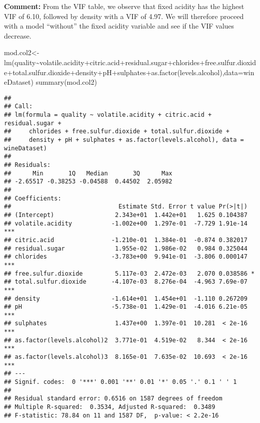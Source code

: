\documentclass[
]{article}
\newenvironment{Shaded}{\begin{snugshade}}{\end{snugshade}}
\newcommand{\AttributeTok}[1]{\textcolor[rgb]{0.77,0.63,0.00}{#1}}
\newcommand{\FunctionTok}[1]{\textcolor[rgb]{0.00,0.00,0.00}{#1}}
\newcommand{\NormalTok}[1]{#1}
\newcommand{\OtherTok}[1]{\textcolor[rgb]{0.56,0.35,0.01}{#1}}
\newcommand{\SpecialCharTok}[1]{\textcolor[rgb]{0.00,0.00,0.00}{#1}}
\begin{document}
\textbf{Comment:} From the VIF table, we observe that fixed acidity has
the highest VIF of 6.10, followed by density with a VIF of 4.97. We will
therefore proceed with a model ``without'' the fixed acidity variable
and see if the VIF values decrease.

\begin{Shaded}
\begin{Highlighting}[]
\NormalTok{mod.col2}\OtherTok{\textless{}{-}}\FunctionTok{lm}\NormalTok{(quality}\SpecialCharTok{\textasciitilde{}}\NormalTok{volatile.acidity}\SpecialCharTok{+}\NormalTok{citric.acid}\SpecialCharTok{+}\NormalTok{residual.sugar}\SpecialCharTok{+}\NormalTok{chlorides}\SpecialCharTok{+}\NormalTok{free.sulfur.dioxide}\SpecialCharTok{+}\NormalTok{total.sulfur.dioxide}\SpecialCharTok{+}\NormalTok{density}\SpecialCharTok{+}\NormalTok{pH}\SpecialCharTok{+}\NormalTok{sulphates}\SpecialCharTok{+}\FunctionTok{as.factor}\NormalTok{(levels.alcohol),}\AttributeTok{data=}\NormalTok{wineDataset)}
\FunctionTok{summary}\NormalTok{(mod.col2)}
\end{Highlighting}
\end{Shaded}

\begin{verbatim}
## 
## Call:
## lm(formula = quality ~ volatile.acidity + citric.acid + residual.sugar + 
##     chlorides + free.sulfur.dioxide + total.sulfur.dioxide + 
##     density + pH + sulphates + as.factor(levels.alcohol), data = wineDataset)
## 
## Residuals:
##      Min       1Q   Median       3Q      Max 
## -2.65517 -0.38253 -0.04588  0.44502  2.05982 
## 
## Coefficients:
##                              Estimate Std. Error t value Pr(>|t|)    
## (Intercept)                 2.343e+01  1.442e+01   1.625 0.104387    
## volatile.acidity           -1.002e+00  1.297e-01  -7.729 1.91e-14 ***
## citric.acid                -1.210e-01  1.384e-01  -0.874 0.382017    
## residual.sugar              1.955e-02  1.986e-02   0.984 0.325044    
## chlorides                  -3.783e+00  9.941e-01  -3.806 0.000147 ***
## free.sulfur.dioxide         5.117e-03  2.472e-03   2.070 0.038586 *  
## total.sulfur.dioxide       -4.107e-03  8.276e-04  -4.963 7.69e-07 ***
## density                    -1.614e+01  1.454e+01  -1.110 0.267209    
## pH                         -5.738e-01  1.429e-01  -4.016 6.21e-05 ***
## sulphates                   1.437e+00  1.397e-01  10.281  < 2e-16 ***
## as.factor(levels.alcohol)2  3.771e-01  4.519e-02   8.344  < 2e-16 ***
## as.factor(levels.alcohol)3  8.165e-01  7.635e-02  10.693  < 2e-16 ***
## ---
## Signif. codes:  0 '***' 0.001 '**' 0.01 '*' 0.05 '.' 0.1 ' ' 1
## 
## Residual standard error: 0.6516 on 1587 degrees of freedom
## Multiple R-squared:  0.3534, Adjusted R-squared:  0.3489 
## F-statistic: 78.84 on 11 and 1587 DF,  p-value: < 2.2e-16
\end{verbatim}
\end{document}
